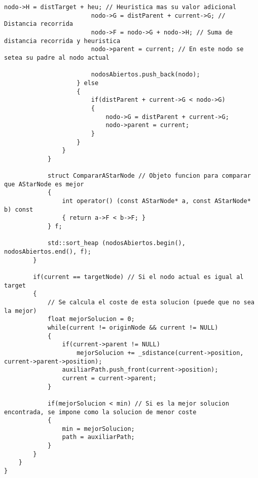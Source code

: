 \begin{lstlisting}[frame=single]
                        nodo->H = distTarget + heu; // Heuristica mas su valor adicional
                        nodo->G = distParent + current->G; // Distancia recorrida
                        nodo->F = nodo->G + nodo->H; // Suma de distancia recorrida y heuristica
                        nodo->parent = current; // En este nodo se setea su padre al nodo actual
                        
                        nodosAbiertos.push_back(nodo);
                    } else
                    {
                        if(distParent + current->G < nodo->G)
                        {
                            nodo->G = distParent + current->G;
                            nodo->parent = current;
                        }
                    }
                }
            }
            
            struct CompararAStarNode // Objeto funcion para comparar que AStarNode es mejor
            {
                int operator() (const AStarNode* a, const AStarNode* b) const
                { return a->F < b->F; }
            } f;
            
            std::sort_heap (nodosAbiertos.begin(), nodosAbiertos.end(), f);
        }
        
        if(current == targetNode) // Si el nodo actual es igual al target
        {
            // Se calcula el coste de esta solucion (puede que no sea la mejor)
            float mejorSolucion = 0;
            while(current != originNode && current != NULL)
            {
                if(current->parent != NULL)
                    mejorSolucion += _sdistance(current->position, current->parent->position);
                auxiliarPath.push_front(current->position);
                current = current->parent;
            }
            
            if(mejorSolucion < min) // Si es la mejor solucion encontrada, se impone como la solucion de menor coste
            {
                min = mejorSolucion;
                path = auxiliarPath;
            }
        }
    }
}
\end{lstlisting}
